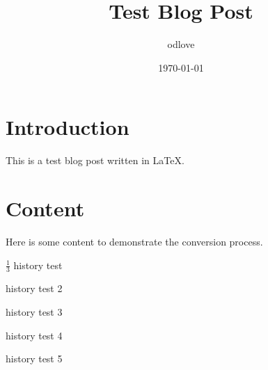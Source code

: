 \documentclass{article}
\begin{document}
\title{Test Blog Post}
\author{odlove}
\date{\today}
\maketitle

\section{Introduction}

This is a test blog post written in \LaTeX.

\section{Content}

Here is some content to demonstrate the conversion process.


$\frac{1}{3}$
history test

history test 2

history test 3

history test 4

history test 5
\end{document}
